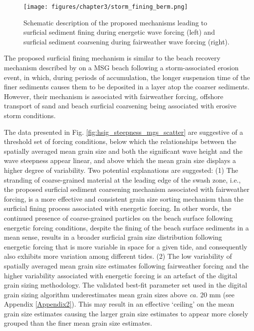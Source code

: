 \begin{figure}[tbp] %
	\begin{center}
		\texttt{[image: figures/chapter3/storm\_fining\_berm.png]}
		\caption[Schematic description of surficial sediment fining mechanisms during energetic wave forcing]{Schematic description of the proposed mechanisms leading to surficial sediment fining during energetic wave forcing (left) and surficial sediment coarsening during fairweather wave forcing (right).}
		\label{fig:storm_fining}
	\end{center}
\end{figure}

The proposed surficial fining mechanism is similar to the beach recovery mechanism described by \citet{Bramato_etal2012} on a MSG beach following a storm-associated erosion event, in which, during periods of accumulation, the longer suspension time of the finer sediments causes them to be deposited in a layer atop the coarser sediments. However, their mechanism is associated with fairweather forcing, offshore transport of sand and beach surficial coarsening being associated with erosive storm conditions.

The data presented in Fig. \ref{fig:hsig_steepness_mgs_scatter} are suggestive of a threshold set of forcing conditions, below which the relationships between the spatially averaged mean grain size and both the significant wave height and the wave steepness appear linear, and above which the mean grain size displays a higher degree of variability. Two potential explanations are suggested: (1) The stranding of coarse-grained material at the leading edge of the swash zone, i.e., the proposed surficial sediment coarsening mechanism associated with fairweather forcing, is a more effective and consistent grain size sorting mechanism than the surficial fining process associated with energetic forcing. In other words, the continued presence of coarse-grained particles on the beach surface following energetic forcing conditions, despite the fining of the beach surface sediments in a mean sense, results in a broader surficial grain size distribution following energetic forcing that is more variable in space for a given tide, and consequently also exhibits more variation among different tides. (2) The low variability of spatially averaged mean grain size estimates following fairweather forcing and the higher variability associated with energetic forcing is an artefact of the digital grain sizing methodology. The validated best-fit parameter set used in the digital grain sizing algorithm underestimates mean grain sizes above \textit{ca.} 20 mm (see Appendix \ref{Appendix2}). This may result in an effective `ceiling' on the mean grain size estimates causing the larger grain size estimates to appear more closely grouped than the finer mean grain size estimates.

